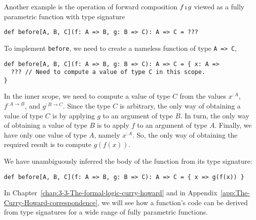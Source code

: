 Another example is the operation of forward composition $f\bef g$
viewed as a fully parametric function with type signature
\begin{lstlisting}
def before[A, B, C](f: A => B, g: B => C): A => C = ???
\end{lstlisting}
To implement \lstinline!before!, we need to create a nameless function
of type \lstinline!A => C!,
\begin{lstlisting}
def before[A, B, C](f: A => B, g: B => C): A => C = { x: A =>
  ??? // Need to compute a value of type C in this scope.
}
\end{lstlisting}
In the inner scope, we need to compute a value of type $C$ from the
values $x^{:A}$, $f^{:A\rightarrow B}$, and $g^{:B\rightarrow C}$.
Since the type $C$ is arbitrary, the only way of obtaining a value
of type $C$ is by applying $g$ to an argument of type $B$. In turn,
the only way of obtaining a value of type $B$ is to apply $f$ to
an argument of type $A$. Finally, we have only one value of type
$A$, namely $x^{:A}$. So, the only way of obtaining the required
result is to compute $g(f(x))$.

We have unambiguously inferred the body of the function from its type
signature:
\begin{lstlisting}
def before[A, B, C](f: A => B, g: B => C): A => C = { x => g(f(x)) }
\end{lstlisting}

In Chapter~\ref{chap:3-3-The-formal-logic-curry-howard} and in Appendix~\ref{app:The-Curry-Howard-correspondence},
we will see how a function's code can be derived from type signatures
for a wide range of fully parametric functions.
